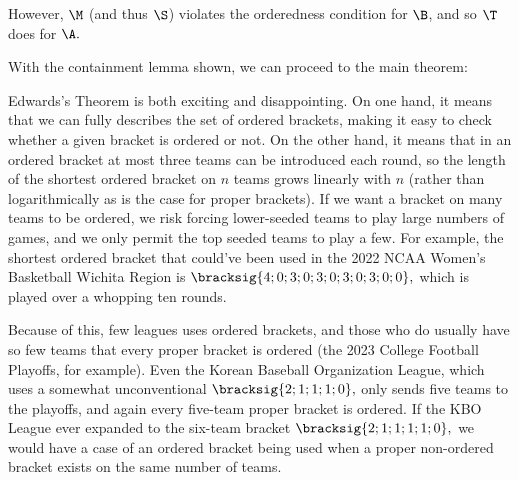 {{    However, $\M$ (and thus $\S$) violates the orderedness condition for $\B$, and so $\T$ does for $\A.$ 
}{}

With the containment lemma shown, we can proceed to the main theorem:


Edwards's Theorem is both exciting and disappointing. On one hand, it means that we can fully describes the set of ordered brackets, making it easy to check whether a given bracket is ordered or not. On the other hand, it means that in an ordered bracket at most three teams can be introduced each round, so the length of the shortest ordered bracket on $n$ teams grows linearly with $n$ (rather than logarithmically as is the case for proper brackets). If we want a bracket on many teams to be ordered, we risk forcing lower-seeded teams to play large numbers of games, and we only permit the top seeded teams to play a few. For example, the shortest ordered bracket that could've been used in the 2022 NCAA Women's Basketball Wichita Region is $\bracksig{4; 0; 3; 0; 3; 0; 3; 0; 3; 0; 0},$ which is played over a whopping ten rounds.


Because of this, few leagues uses ordered brackets, and those who do usually have so few teams that every proper bracket is ordered (the 2023 College Football Playoffs, for example). Even the Korean Baseball Organization League, which uses a somewhat unconventional $\bracksig{2; 1; 1; 1; 0},$ only sends five teams to the playoffs, and again every five-team proper bracket is ordered. If the KBO League ever expanded to the six-team bracket $\bracksig{2; 1; 1; 1; 1; 0},$ we would have a case of an ordered bracket being used when a proper non-ordered bracket exists on the same number of teams.

}
